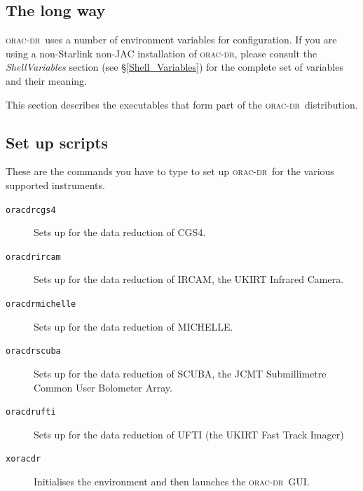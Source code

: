\documentclass[twoside,11pt]{article}
\renewcommand{\_}{\texttt{\symbol{95}}}
\newcommand{\oracdr}{\textsc{orac-dr}}
\begin{document}
\subsection*{The long way\label{Setting_up_to_run_oracdr_The_long_way}}

\oracdr\ uses a number of environment variables for configuration. If
you are using a non-Starlink non-JAC installation of \oracdr, please
consult the \emph{ShellVariables} section (see
\S\ref{Shell_Variables}) for the complete set of variables and their
meaning.



This section describes the executables that form part of the \oracdr\
distribution.

\subsection*{Set up scripts\label{ORAC-DR_Components_Set_up_scripts}}

These are the commands you have to type to set up \oracdr\ for the various
supported instruments.

\begin{description}
\item[\texttt{oracdr\_cgs4}] \mbox{}

Sets up for the data reduction of CGS4.

\item[\texttt{oracdr\_ircam}] \mbox{}

Sets up for the data reduction of IRCAM, the UKIRT Infrared Camera.

\item[\texttt{oracdr\_michelle}] \mbox{}

Sets up for the data reduction of MICHELLE.

\item[\texttt{oracdr\_scuba}] \mbox{}

Sets up for the data reduction of SCUBA, the JCMT Submillimetre Common
User Bolometer Array.

\item[\texttt{oracdr\_ufti}] \mbox{}

Sets up for the data reduction of UFTI (the UKIRT Fast Track Imager)

\item[\texttt{xoracdr}] \mbox{}

Initialises the environment and then launches the \oracdr\ GUI.

\end{description}
\end{document}
